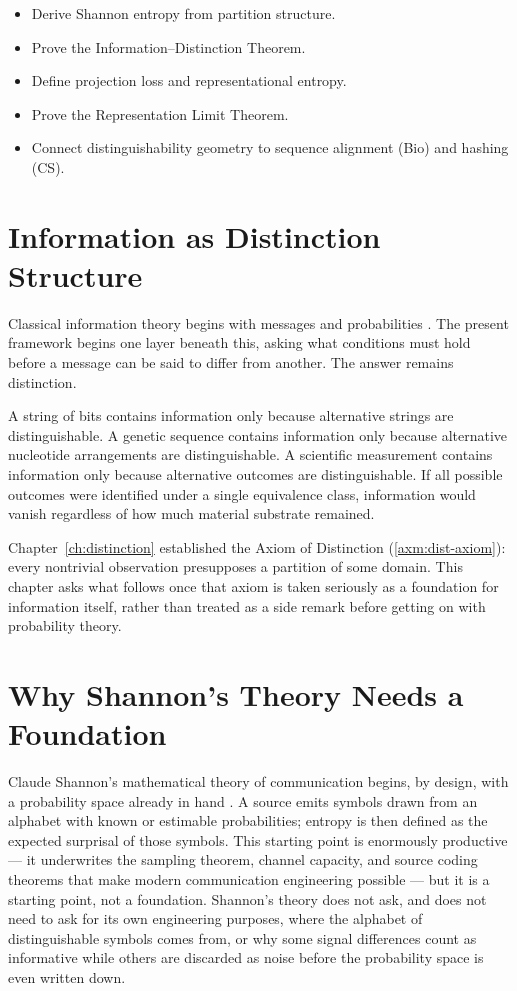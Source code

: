 \documentclass[12pt,twoside,openright]{book}
\newenvironment{objectives}{%
  \begin{tcolorbox}[colback=DistBlue!5,colframe=DistBlue,
    title={\faCheckCircle\enspace Learning Objectives},
    fonttitle=\sffamily\bfseries\color{white},
    attach boxed title to top left={yshift=-2mm,xshift=4mm},
    boxed title style={colback=DistBlue},breakable]
  \begin{itemize}[leftmargin=*,nosep]}{%
  \end{itemize}\end{tcolorbox}\vspace{1em}}
\begin{document}
\begin{objectives}
  \item Derive Shannon entropy from partition structure.
  \item Prove the Information--Distinction Theorem.
  \item Define projection loss and representational entropy.
  \item Prove the Representation Limit Theorem.
  \item Connect distinguishability geometry to sequence
        alignment (Bio) and hashing (CS).
\end{objectives}

\section{Information as Distinction Structure}
\label{sec:ch2-info}

Classical information theory begins with messages and
probabilities \parencite{shannon1948,cover2006}.
The present framework begins one layer beneath this,
asking what conditions must hold before a message can
be said to differ from another. The answer remains
distinction. 

A string of bits contains information only because
alternative strings are distinguishable. A genetic
sequence contains information only because alternative
nucleotide arrangements are distinguishable. A scientific
measurement contains information only because alternative
outcomes are distinguishable. If all possible outcomes
were identified under a single equivalence class,
information would vanish regardless of how much material
substrate remained.

Chapter~\ref{ch:distinction} established the Axiom of
Distinction (\cref{axm:dist-axiom}): every nontrivial
observation presupposes a partition of some domain. This
chapter asks what follows once that axiom is taken seriously
as a foundation for information itself, rather than treated
as a side remark before getting on with probability theory.

\section{Why Shannon's Theory Needs a Foundation}
\label{sec:ch2-shannon-foundation}

Claude Shannon's mathematical theory of communication begins,
by design, with a probability space already in hand
\parencite{shannon1948,shannon1949}. A source emits symbols
drawn from an alphabet with known or estimable probabilities;
entropy is then defined as the expected surprisal of those
symbols. This starting point is enormously productive --- it
underwrites the sampling theorem, channel capacity, and
source coding theorems that make modern communication
engineering possible \parencite{cover2006,mackay2003} --- but
it is a starting point, not a foundation. Shannon's theory
does not ask, and does not need to ask for its own engineering
purposes, where the alphabet of distinguishable symbols comes
from, or why some signal differences count as informative
while others are discarded as noise before the probability
space is even written down.
\end{document}
